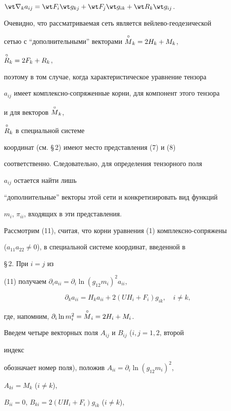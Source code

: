 $\wt\nabla_{k}a_{ij}=\wt F_i\wt g_{kj}+\wt F_j\wt g_{ik}+\wt R_k\wt 


g_{ij}$. 


 


Очевидно, что рассматриваемая сеть является вейлево-геодезической 


сетью с ``дополнительными'' векторами $\overset{\circ}{M}{}_k=2H_k+M_k$, 


$\overset{\circ}{R}{}_k=2F_k+R_k$, 


поэтому в том случае, когда характеристическое уравнение тензора 


$a_{ij}$ имеет комплексно-сопряженные корни, для компонент этого тензора


и для векторов $\overset{\circ}{M}{}_k$, 


$\overset{\circ}{R}{}_k$ в специальной системе  


координат (см. \S\,2) имеют место представления (7) и (8) 


соответственно. Следовательно, для определения тензорного поля


$a_{ij}$ остается найти лишь 


``дополнительные'' векторы этой сети и конкретизировать вид функций 


$m_i$, $\pi_{ii}$, входящих в эти представления. 


 


Рассмотрим (11), считая, что корни уравнения (1) комплексно-сопряжены 


($a_{11}a_{22}\ne 0$), в специальной системе координат, введенной в


\S\,2. При $i=j$ из  


(11) получаем $\partial_i a_{ii}=\partial_i\ln(g_{12}m_i)^2a_{ii}$, 


$$ 


\partial_k a_{ii}=H_k a_{ii}+2(U H_i+F_i)g_{ik},\quad i\ne k, 


$$ 


где, напомним, $\partial_i\ln m^2_i=\overset{\circ}{M}{}_i=2H_i+M_i$. 


Введем четыре векторных поля $A_{ij}$ и $B_{ij}$ ($i,j=1,2$, второй 


индекс  


обозначает номер поля), положив $A_{ii}=\partial_i\ln(g_{12}m_i)^2$, 


$A_{ki}=M_k$ ($i\ne k$), 


$B_{ii}=0$, $B_{ki}=2(U H_i+F_i)g_{ik}$ ($i\ne k$), 


